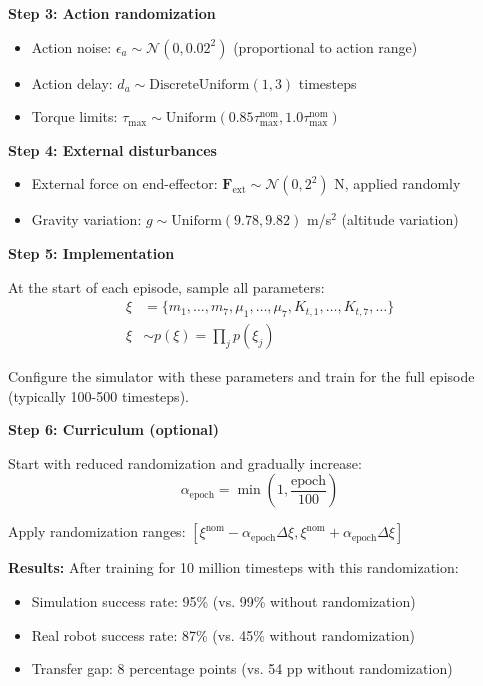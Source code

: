 \begin{example}
\textbf{Step 3: Action randomization}

\begin{itemize}
    \item Action noise: $\epsilon_a \sim \mathcal{N}(0, 0.02^2)$ (proportional to action range)
    \item Action delay: $d_a \sim \text{DiscreteUniform}(1, 3)$ timesteps
    \item Torque limits: $\tau_{\max} \sim \text{Uniform}(0.85 \tau_{\max}^{\text{nom}}, 1.0 \tau_{\max}^{\text{nom}})$
\end{itemize}

\textbf{Step 4: External disturbances}

\begin{itemize}
    \item External force on end-effector: $\mathbf{F}_{\text{ext}} \sim \mathcal{N}(0, 2^2)$ N, applied randomly
    \item Gravity variation: $g \sim \text{Uniform}(9.78, 9.82)$ m/s$^2$ (altitude variation)
\end{itemize}

\textbf{Step 5: Implementation}

At the start of each episode, sample all parameters:
\begin{align*}
\xi &= \{m_1, \ldots, m_7, \mu_1, \ldots, \mu_7, K_{t,1}, \ldots, K_{t,7}, \ldots\} \\
\xi &\sim p(\xi) = \prod_j p(\xi_j)
\end{align*}

Configure the simulator with these parameters and train for the full episode (typically 100-500 timesteps).

\textbf{Step 6: Curriculum (optional)}

Start with reduced randomization and gradually increase:
\begin{equation}
\alpha_{\text{epoch}} = \min\left(1, \frac{\text{epoch}}{100}\right)
\end{equation}

Apply randomization ranges: $[\xi^{\text{nom}} - \alpha_{\text{epoch}} \Delta\xi, \xi^{\text{nom}} + \alpha_{\text{epoch}} \Delta\xi]$

\textbf{Results:}
After training for 10 million timesteps with this randomization:
\begin{itemize}
    \item Simulation success rate: 95\% (vs. 99\% without randomization)
    \item Real robot success rate: 87\% (vs. 45\% without randomization)
    \item Transfer gap: 8 percentage points (vs. 54 pp without randomization)
\end{itemize}
\end{example}

